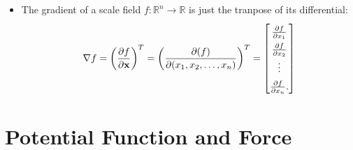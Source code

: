 \documentclass[10pt]{article}
\newcommand{\ve}[1]{\mathbf{#1}}
\newcommand{\ra}{\rightarrow}
\newcommand{\Real}{\mathbb{R}}
\begin{document}
\begin{itemize}
    \item The gradient of a scale field $f : \Real^n \ra \Real$ is just the tranpose of its differential:
    \begin{align*}
      \renewcommand{\arraystretch}{1.5}
      \nabla f = \bigg( \frac{\partial f }{\partial \ve{x}} \bigg)^T = \bigg( \frac{\partial (f) }{\partial (x_1, x_2, \dotsc, x_n)} \bigg)^T 
      = \begin{bmatrix}
        \frac{\partial f}{\partial x_1} \\
        \frac{\partial f}{\partial x_2} \\
        \vdots \\
        \frac{\partial f}{\partial x_n}.
      \end{bmatrix}
    \end{align*}
  \end{itemize}

  \section{Potential Function and Force}
\end{document}
